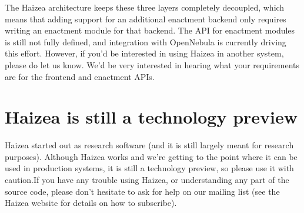 The Haizea architecture keeps these three layers completely decoupled, which means that adding support for an additional enactment backend only requires writing an enactment module for that backend. The API for enactment modules is still not fully defined, and integration with OpenNebula is currently driving this effort. However, if you'd be interested in using Haizea in another system, please do let us know. We'd be very interested in hearing what your requirements are for the frontend and enactment APIs.

\section{Haizea is still a technology preview}

Haizea started out as research software (and it is still largely meant for research purposes). Although Haizea works and we're getting to the point where it can be used in production systems, it is still a technology preview, so please use it with caution.If you have any trouble using Haizea, or understanding any part of the source code, please don't hesitate to ask for help on our mailing list (see the Haizea website for details on how to subscribe).